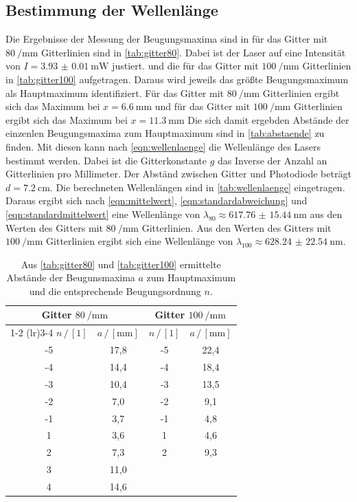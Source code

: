 \subsection{Bestimmung der Wellenlänge}
\label{subsec:well}
Die Ergebnisse der Messung der Beugungsmaxima sind in für das Gitter mit $\qty{80}{\per\milli\meter}$ Gitterlinien sind in \autoref{tab:gitter80}.
Dabei ist der Laser auf eine Intensität von $I=\qty{3.93(1)}{\milli\watt}$ justiert.
und die für das Gitter mit $\qty{100}{\per\milli\meter}$ Gitterlinien in \autoref{tab:gitter100} aufgetragen. 
Daraus wird jeweils das größte Beugungsmaximum als Hauptmaximum identifiziert. 
Für das Gitter mit $\qty{80}{\per\milli\meter}$ Gitterlinien ergibt sich das Maximum bei $x=\qty{6.6}{\milli\meter}$ 
und für das Gitter mit $\qty{100}{\per\milli\meter}$ Gitterlinien ergibt sich das Maximum bei $x=\qty{11.3}{\milli\meter}$
Die sich damit ergebden Abstände der einzenlen Beugungsmaxima zum Hauptmaximum sind in \autoref{tab:abstaende} zu finden.
Mit diesen kann nach \autoref{eqn:wellenlaenge} die Wellenlänge des Lasers bestimmt werden. 
Dabei ist die Gitterkonstante $g$ das Inverse der Anzahl an Gitterlinien pro Millimeter. 
Der Abständ zwischen Gitter und Photodiode beträgt $d=\qty{7.2}{\centi\meter}$.
Die berechneten Wellenlängen sind in \autoref{tab:wellenlaenge} eingetragen. 
Daraus ergibt sich nach \autoref{eqn:mittelwert}, \autoref{eqn:standardabweichung} und \autoref{eqn:standardmittelwert} eine Wellenlänge von $\lambda_{80} \approx \qty{617.76(1544)}{\nano\meter}$ 
aus den Werten des Gitters mit $\qty{80}{\per\milli\meter}$ Gitterlinien.
Aus den Werten des Gitters mit $\qty{100}{\per\milli\meter}$ Gitterlinien ergibt sich eine Wellenlänge von $\lambda_{100} \approx \qty{628.24(2254)}{\nano\meter}$.

\begin{table}[H]   
  \centering
  \caption{Aus \autoref{tab:gitter80} und \autoref{tab:gitter100} ermittelte Abstände der Beugunsmaxima $a$ zum Hauptmaximum und die entsprechende Beugungsordnung $n$.}
  \begin{tabular}{cc cc}
  \toprule
  \multicolumn{2}{c}{Gitter $\qty{80}{\per\milli\meter}$} &
  \multicolumn{2}{c}{Gitter $\qty{100}{\per\milli\meter}$} \\
  \cmidrule(lr){1-2} \cmidrule(lr){3-4}
  $n \,/\, [1]$&
  $a \,/\, [\unit{\milli\meter}]$ &
  $n \,/\, [1]$&
  $a \,/\, [\unit{\milli\meter}]$ \\
  \midrule
  -5  &  17,8 & -5 & 22,4 \\  
  -4  &  14,4 & -4 & 18,4 \\
  -3  &  10,4 & -3 & 13,5 \\
  -2  &  7,0  & -2 & 9,1 \\
  -1  &  3,7  & -1 & 4,8 \\
  1  &  3,6   & 1  & 4,6 \\
  2  &  7,3   & 2  & 9,3 \\
  3  &  11,0  & {} & {} \\
  4  &  14,6  & {} & {} \\
  \bottomrule
  \end{tabular}
  \label{tab:abstaende}
\end{table}



